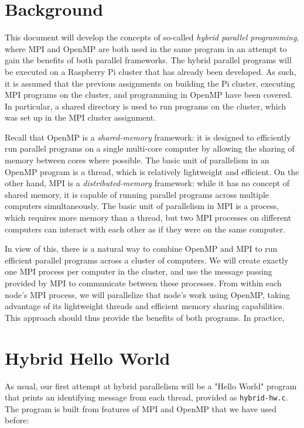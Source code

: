 \documentclass{article}
\theoremstyle{definition}
\begin{document}
\section{Background}

This document will develop the concepts of so-called \emph{hybrid parallel programming}, where MPI and OpenMP are both used in the same program in an attempt to gain the benefits of both parallel frameworks. The hybrid parallel programs will be executed on a Raspberry Pi cluster that has already been developed. As such, it is assumed that the previous assignments on building the Pi cluster, executing MPI programs on the cluster, and programming in OpenMP have been covered. In particular, a shared directory is used to run programs on the cluster, which was set up in the MPI cluster assignment.

Recall that OpenMP is a \emph{shared-memory} framework: it is designed to efficiently run parallel programs on a single multi-core computer by allowing the sharing of memory between cores where possible. The basic unit of parallelism in an OpenMP program is a thread, which is relatively lightweight and efficient. On the other hand, MPI is a \emph{distributed-memory} framework: while it has no concept of shared memory, it is capable of running parallel programs across multiple computers simultaneously. The basic unit of parallelism in MPI is a process, which requires more memory than a thread, but two MPI processes on different computers can interact with each other as if they were on the same computer.

In view of this, there is a natural way to combine OpenMP and MPI to run efficient parallel programs across a cluster of computers. We will create exactly one MPI process per computer in the cluster, and use the message passing provided by MPI to communicate between these processes. From within each node's MPI process, we will parallelize that node's work using OpenMP, taking advantage of its lightweight threads and efficient memory sharing capabilities. This approach should thus provide the benefits of both programs. In practice, 

\section{Hybrid Hello World}

As usual, our first attempt at hybrid parallelism will be a "Hello World" program that prints an identifying message from each thread, provided as \texttt{hybrid-hw.c}. The program is built from features of MPI and OpenMP that we have used before:
\end{document}
